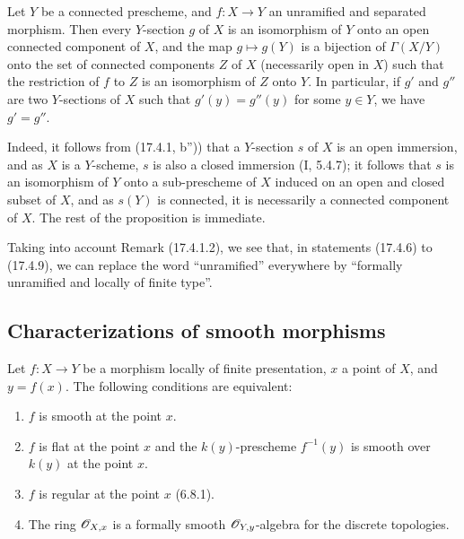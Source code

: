 \begin{proposition}[17.4.9]
\label{IV.17.4.9}
Let $Y$ be a connected prescheme, and $f:X\to Y$ an unramified and separated morphism. Then every $Y$-section $g$ of $X$ is an isomorphism of $Y$ onto an open connected component of $X$, and the map $g\mapsto g(Y)$ is a bijection of $\Gamma(X/Y)$ onto the set of connected components $Z$ of $X$ (necessarily open in $X$) such that the restriction of $f$ to $Z$ is an isomorphism of $Z$ onto $Y$. In particular, if $g'$ and $g''$ are two $Y$-sections of $X$ such that $g'(y)=g''(y)$ for some $y\in Y$, we have $g'=g''$.
\end{proposition}

Indeed, it follows from (17.4.1, b'')) that a $Y$-section $s$ of $X$ is an open immersion, and as $X$ is a $Y$-scheme, $s$ is also a closed immersion (I, 5.4.7); it follows that $s$ is an isomorphism of $Y$ onto a sub-prescheme of $X$ induced on an open and closed subset of $X$, and as $s(Y)$ is connected, it is necessarily a connected component of $X$. The rest of the proposition is immediate.

\begin{remark}[17.4.10]
\label{IV.17.4.10}
Taking into account Remark (17.4.1.2), we see that, in statements (17.4.6) to (17.4.9), we can replace the word ``unramified'' everywhere by ``formally unramified and locally of finite type''.
\end{remark}


\subsection{Characterizations of smooth morphisms}

\begin{theorem}[17.5.1]
\label{IV.17.5.1}
Let $f:X\to Y$ be a morphism locally of finite presentation, $x$ a point of $X$, and $y=f(x)$. The following conditions are equivalent:
\begin{enumerate}
  \item[a)] $f$ is smooth at the point $x$.
  \item[b)] $f$ is flat at the point $x$ and the $k(y)$-prescheme $f^{-1}(y)$ is smooth over $k(y)$ at the point $x$.
  \item[b')] $f$ is regular at the point $x$ (6.8.1).
  \item[c)] The ring $\mathscr{O}_{X,x}$ is a formally smooth $\mathscr{O}_{Y,y}$-algebra for the discrete topologies.
\end{enumerate}
\end{theorem}

